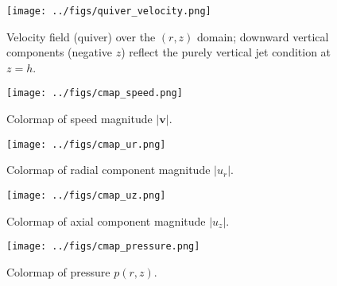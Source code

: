 \documentclass[11pt,a4paper]{article}
\begin{document}
\begin{figure}[t]
  \centering
  \texttt{[image: ../figs/quiver\_velocity.png]}
  \caption{Velocity field (quiver) over the $(r,z)$ domain; downward vertical components (negative $z$) reflect the purely vertical jet condition at $z=h$.}
  \label{fig:quiver}
\end{figure}

\begin{figure}[t]
  \centering
  \texttt{[image: ../figs/cmap\_speed.png]}
  \caption{Colormap of speed magnitude $\lvert \mathbf{v}\rvert$.}
  \label{fig:cmap_speed}
\end{figure}

\begin{figure}[t]
  \centering
  \texttt{[image: ../figs/cmap\_ur.png]}
  \caption{Colormap of radial component magnitude $\lvert u_r\rvert$.}
  \label{fig:cmap_ur}
\end{figure}

\begin{figure}[t]
  \centering
  \texttt{[image: ../figs/cmap\_uz.png]}
  \caption{Colormap of axial component magnitude $\lvert u_z\rvert$.}
  \label{fig:cmap_uz}
\end{figure}

\begin{figure}[t]
  \centering
  \texttt{[image: ../figs/cmap\_pressure.png]}
  \caption{Colormap of pressure $p(r,z)$.}
  \label{fig:cmap_p}
\end{figure}
\end{document}
